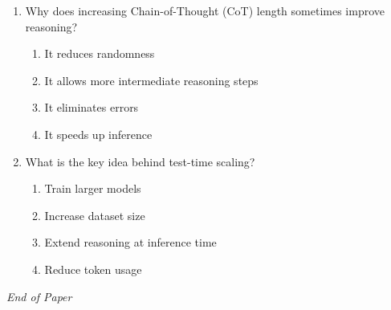 \documentclass[12pt]{article}
\begin{document}
\begin{enumerate}[label=Q\arabic*.]
\begin{enumerate}[label=(\Alph*)]
    \item Improved model confidence
    \item Reduced inference time
    \item Automatic conflict resolution
    \item Increased hallucination risk
\end{enumerate}
\item Why does increasing Chain-of-Thought (CoT) length sometimes improve reasoning?
\begin{enumerate}[label=(\Alph*)]
    \item It reduces randomness
    \item It allows more intermediate reasoning steps
    \item It eliminates errors
    \item It speeds up inference
\end{enumerate}
\item What is the key idea behind test-time scaling?
\begin{enumerate}[label=(\Alph*)]
    \item Train larger models
    \item Increase dataset size
    \item Extend reasoning at inference time
    \item Reduce token usage
\end{enumerate}
\end{enumerate}

\vfill
\noindent\textit{End of Paper}
\end{document}
